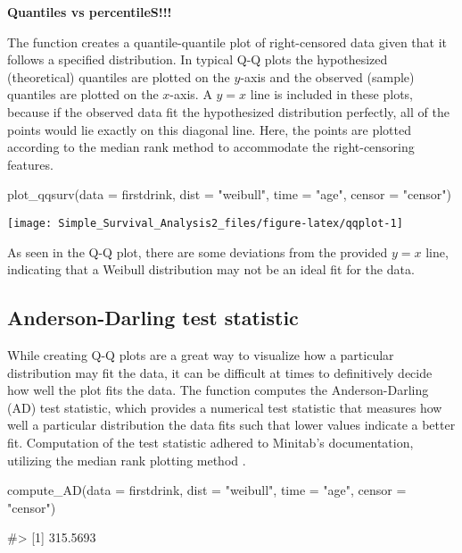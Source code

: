 \textbf{Quantiles vs percentileS!!!}

The  function creates a quantile-quantile plot of
right-censored data given that it follows a specified distribution. In
typical Q-Q plots the hypothesized (theoretical) quantiles are plotted
on the \(y\)-axis and the observed (sample) quantiles are plotted on the
\(x\)-axis. A \(y=x\) line is included in these plots, because if the
observed data fit the hypothesized distribution perfectly, all of the
points would lie exactly on this diagonal line. Here, the points are
plotted according to the median rank method \citep{Minitabqq} to
accommodate the right-censoring features.

\begin{Schunk}
\begin{Sinput}
plot_qqsurv(data = firstdrink, dist = "weibull", time = "age", censor = "censor")
\end{Sinput}

\texttt{[image: Simple\_Survival\_Analysis2\_files/figure-latex/qqplot-1]} \end{Schunk}

As seen in the Q-Q plot, there are some deviations from the provided
\(y=x\) line, indicating that a Weibull distribution may not be an ideal
fit for the data.

\hypertarget{anderson-darling-test-statistic}{%
\subsection{Anderson-Darling test
statistic}\label{anderson-darling-test-statistic}}

While creating Q-Q plots are a great way to visualize how a particular
distribution may fit the data, it can be difficult at times to
definitively decide how well the plot fits the data. The
 function computes the Anderson-Darling (AD) test
statistic, which provides a numerical test statistic that measures how
well a particular distribution the data fits such that lower values
indicate a better fit. Computation of the test statistic adhered to
Minitab's documentation, utilizing the median rank plotting method
\citep{Minitabgof}.

\begin{Schunk}
\begin{Sinput}
compute_AD(data = firstdrink, dist = "weibull", time = "age", censor = "censor")
\end{Sinput}
\begin{Soutput}
#> [1] 315.5693
\end{Soutput}
\end{Schunk}

